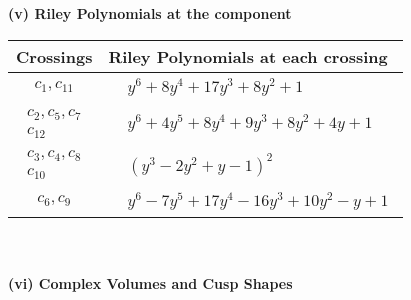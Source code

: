 \documentclass[1p]{elsarticle_modified}
\theoremstyle{definition}
\begin{document}
\newpage\renewcommand{\arraystretch}{1}
\flushleft \textbf{(v) Riley Polynomials at the component}\newline \\
\begin{tabular}{m{50pt}|m{274pt}}
Crossings & \hspace{64pt}Riley Polynomials at each crossing \\
\hline $$\begin{aligned}c_{1},c_{11}\end{aligned}$$&$\begin{aligned}
&y^6+8 y^4+17 y^3+8 y^2+1
\end{aligned}$\\
\hline $$\begin{aligned}c_{2},c_{5},c_{7}\\c_{12}\end{aligned}$$&$\begin{aligned}
&y^6+4 y^5+8 y^4+9 y^3+8 y^2+4 y+1
\end{aligned}$\\
\hline $$\begin{aligned}c_{3},c_{4},c_{8}\\c_{10}\end{aligned}$$&$\begin{aligned}
&(y^3-2 y^2+y-1)^2
\end{aligned}$\\
\hline $$\begin{aligned}c_{6},c_{9}\end{aligned}$$&$\begin{aligned}
&y^6-7 y^5+17 y^4-16 y^3+10 y^2- y+1
\end{aligned}$\\
\hline
\end{tabular}\\~\\
\newpage\flushleft \textbf{(vi) Complex Volumes and Cusp Shapes}
\end{document}
